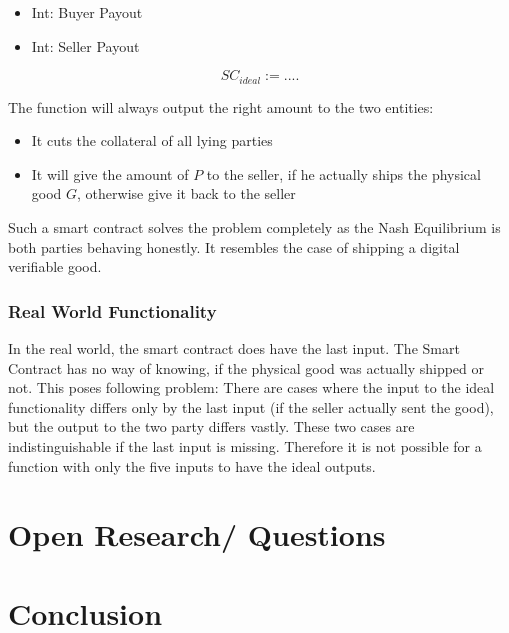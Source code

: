 \documentclass{cacthesis}
\begin{document}
\begin{itemize}
\item{Int: Buyer Payout}
\item{Int: Seller Payout}
\end{itemize}

\begin{equation}
	SC_{ideal}:= ....	
\end{equation}

The function will always output the right amount to the two entities:
\begin{itemize}
    \item It cuts the collateral of all lying parties
    \item It will give the amount of $P$ to the seller, if he actually ships the physical good $G$, otherwise give it back to the seller
\end{itemize}

Such a smart contract solves the problem completely as the Nash Equilibrium is both parties behaving honestly.%
It resembles the case of shipping a digital verifiable good. %

\subsection{Real World Functionality}
In the real world, the smart contract does have the last input. The Smart Contract has no way of knowing, if the physical good was actually shipped or not. \newline
This poses following problem: There are cases where the input to the ideal functionality differs only by the last input (if the seller actually sent the good), but the output to the two party differs vastly. These two cases are indistinguishable if the last input is missing. Therefore it is not possible for a function with only the five inputs to have the ideal outputs.

\chapter{Open Research/ Questions}

\chapter{Conclusion}
	
	
	
	\appendix
\end{document}

